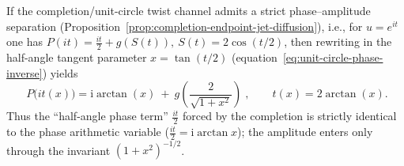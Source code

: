 \begin{remark}\label{rem:unit-circle-phase-completion-half-angle}
If the completion/unit-circle twist channel admits a strict phase--amplitude separation (Proposition~\ref{prop:completion-endpoint-jet-diffusion}), i.e., for \(u=e^{it}\) one has
\(
P(it)=\frac{it}{2}+g(S(t)),\ S(t)=2\cos(t/2)
\),
then rewriting in the half-angle tangent parameter \(x=\tan(t/2)\) (equation~\eqref{eq:unit-circle-phase-inverse}) yields
\[
\boxed{\;
P\!\bigl(it(x)\bigr)
=\mathrm{i}\arctan(x)\ +\ g\!\left(\frac{2}{\sqrt{1+x^2}}\right)\;},
\qquad t(x)=2\arctan(x).
\]
Thus the ``half-angle phase term'' \(\frac{it}{2}\) forced by the completion is strictly identical to the phase arithmetic variable (\(\frac{it}{2}=\mathrm{i}\arctan x\)); the amplitude enters only through the invariant \((1+x^2)^{-1/2}\).
\end{remark}
